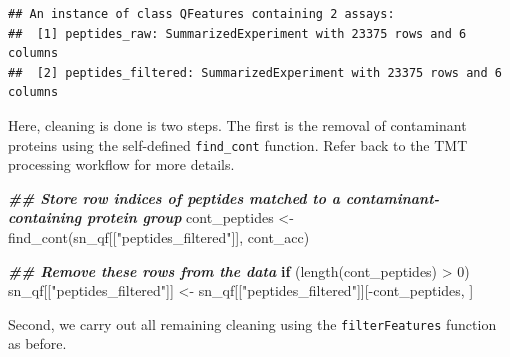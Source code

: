 \documentclass[9pt,a4paper,]{extarticle}
\newenvironment{Shaded}{\begin{snugshade}}{\end{snugshade}}
\newcommand{\ControlFlowTok}[1]{\textcolor[rgb]{0.13,0.29,0.53}{\textbf{#1}}}
\newcommand{\DecValTok}[1]{\textcolor[rgb]{0.00,0.00,0.81}{#1}}
\newcommand{\DocumentationTok}[1]{\textcolor[rgb]{0.56,0.35,0.01}{\textbf{\textit{#1}}}}
\newcommand{\FunctionTok}[1]{\textcolor[rgb]{0.00,0.00,0.00}{#1}}
\newcommand{\NormalTok}[1]{#1}
\newcommand{\OtherTok}[1]{\textcolor[rgb]{0.56,0.35,0.01}{#1}}
\newcommand{\SpecialCharTok}[1]{\textcolor[rgb]{0.00,0.00,0.00}{#1}}
\newcommand{\StringTok}[1]{\textcolor[rgb]{0.31,0.60,0.02}{#1}}
\begin{document}
\begin{verbatim}
## An instance of class QFeatures containing 2 assays:
##  [1] peptides_raw: SummarizedExperiment with 23375 rows and 6 columns 
##  [2] peptides_filtered: SummarizedExperiment with 23375 rows and 6 columns
\end{verbatim}

Here, cleaning is done is two steps. The first is the removal of contaminant
proteins using the self-defined \texttt{find\_cont} function. Refer back to the TMT
processing workflow for more details.

\begin{Shaded}
\begin{Highlighting}[]
\DocumentationTok{\#\# Store row indices of peptides matched to a contaminant{-}containing protein group}
\NormalTok{cont\_peptides }\OtherTok{\textless{}{-}} \FunctionTok{find\_cont}\NormalTok{(sn\_qf[[}\StringTok{"peptides\_filtered"}\NormalTok{]], cont\_acc)}

\DocumentationTok{\#\# Remove these rows from the data}
\ControlFlowTok{if}\NormalTok{ (}\FunctionTok{length}\NormalTok{(cont\_peptides) }\SpecialCharTok{\textgreater{}} \DecValTok{0}\NormalTok{)}
\NormalTok{  sn\_qf[[}\StringTok{"peptides\_filtered"}\NormalTok{]] }\OtherTok{\textless{}{-}}\NormalTok{ sn\_qf[[}\StringTok{"peptides\_filtered"}\NormalTok{]][}\SpecialCharTok{{-}}\NormalTok{cont\_peptides, ]}
\end{Highlighting}
\end{Shaded}

Second, we carry out all remaining cleaning using the \texttt{filterFeatures} function
as before.
\end{document}
